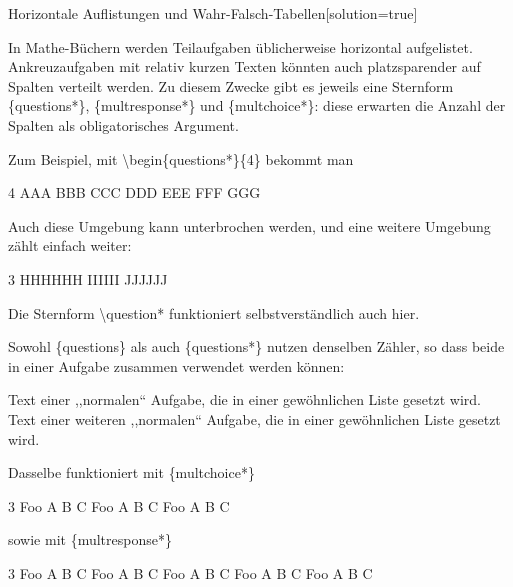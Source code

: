 \documentclass[hyperworksheet,pgfplots]{drcschool}
\newcommand*{\cs}[1]{\textup{\ttfamily\textbackslash#1}}                   %
\newcommand*{\env}[1]{\textup{\ttfamily\{#1\}}}                            %
\begin{document}

\begin{worksheet}{Horizontale Auflistungen und Wahr-Falsch-Tabellen}[solution=true]

In Mathe-Büchern werden Teilaufgaben üblicherweise horizontal aufgelistet.
Ankreuzaufgaben mit relativ kurzen Texten könnten auch platzsparender auf
Spalten verteilt werden. Zu diesem Zwecke gibt es jeweils eine Sternform
\env{questions*}, \env{multresponse*} und \env{multchoice*}: diese erwarten
die Anzahl der Spalten als obligatorisches Argument.

Zum Beispiel, mit \cs{begin\{questions*\}\{4\}} bekommt man
\begin{questions*}{4}
\question AAA
\question* BBB
\question CCC
\question* DDD
\question EEE
\question FFF
\question GGG
\end{questions*}
Auch diese Umgebung kann unterbrochen werden, und eine weitere Umgebung
zählt einfach weiter:
\begin{questions*}{3}
\question HHHHHH
\question IIIIII
\question JJJJJJ
\end{questions*}
Die Sternform \cs{question*} funktioniert selbstverständlich auch hier.

Sowohl \env{questions} als auch \env{questions*} nutzen denselben Zähler, so
dass beide in einer Aufgabe zusammen verwendet werden können:
\begin{questions}
\question Text einer ,,normalen`` Aufgabe, die in einer gewöhnlichen Liste gesetzt wird.
\question Text einer weiteren ,,normalen`` Aufgabe, die in einer gewöhnlichen Liste gesetzt wird.
\end{questions}

\exercise[Ankreuzaufgaben]
Dasselbe funktioniert mit \env{multchoice*}
\begin{multchoice*}{3}
\question Foo
   \choice* A
   \choice B
   \choice C
\question Foo
   \choice A
   \choice B
   \choice* C
\question Foo
   \choice A
   \choice* B
   \choice C
\end{multchoice*}
sowie mit \env{multresponse*}
\begin{multresponse*}{3}
\question Foo
   \choice* A
   \choice B
   \choice* C
\question Foo
   \choice A
   \choice B
   \choice* C
\question Foo
   \choice* A
   \choice* B
   \choice C
\question Foo
   \choice A
   \choice* B
   \choice* C
\question Foo
   \choice A
   \choice* B
   \choice C
\end{multresponse*}


\end{worksheet}
\end{document}

